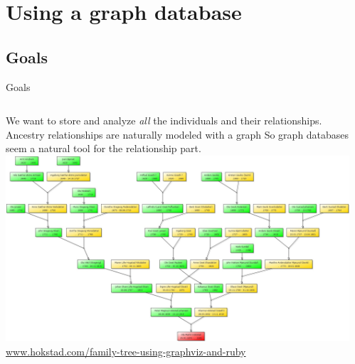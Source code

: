 \documentclass{beamer}
\newcommand{\linespace}{\vskip 0.25cm}
\begin{document}
\section[Using a graph DB]{Using a graph database}

\subsection{Goals}

\begin{frame}{Goals}
	\begin{columns}
		\begin{column}{0.6 \linewidth}
					We want to store and analyze \emph{all} the individuals and their relationships.
					\linespace
					Ancestry relationships are naturally modeled with a graph
					\linespace
					So graph databases seem a natural tool for the relationship part.
					\linespace
					\centering
					\includegraphics[width=0.8 \linewidth]{Figures/olemartin_family_tree.jpg} \\
					\tiny{\url{www.hokstad.com/family-tree-using-graphviz-and-ruby}}
		\end{column}
		\begin{column}{0.4 \linewidth}

\end{column}
\end{columns}
\end{frame}
\end{document}
